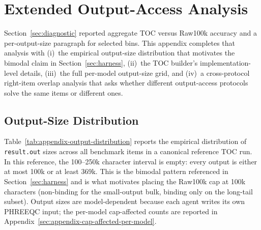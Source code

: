 \documentclass{article}
\begin{document}
\section{Extended Output-Access Analysis}
\label{sec:appendix-output-access}

Section~\ref{sec:diagnostic} reported aggregate TOC versus Raw100k accuracy and a per-output-size paragraph for selected bins. This appendix completes that analysis with (i)~the empirical output-size distribution that motivates the bimodal claim in Section~\ref{sec:harness}, (ii)~the TOC builder's implementation-level details, (iii)~the full per-model output-size grid, and (iv)~a cross-protocol right-item overlap analysis that asks whether different output-access protocols solve the same items or different ones.

\subsection{Output-Size Distribution}
\label{sec:appendix-output-distribution}

Table~\ref{tab:appendix-output-distribution} reports the empirical distribution of \texttt{result.out} sizes across all \BenchN{} benchmark items in a canonical reference TOC run. In this reference, the 100--250k character interval is empty: every output is either at most 100k or at least 369k. This is the bimodal pattern referenced in Section~\ref{sec:harness} and is what motivates placing the Raw100k cap at 100k characters (non-binding for the small-output bulk, binding only on the long-tail subset). Output sizes are model-dependent because each agent writes its own PHREEQC input; the per-model cap-affected counts are reported in Appendix~\ref{sec:appendix-cap-affected-per-model}.
\end{document}
